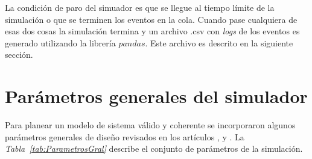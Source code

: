 La condición de paro del simuador es que se llegue al tiempo límite de la simulación o que se terminen los eventos en la cola. Cuando pase cualquiera de esas dos cosas la simulación termina y un archivo .csv con \textit{logs} de los eventos es generado utilizando la librería $pandas$. Este archivo es descrito en la siguiente sección. \newline



\section{Parámetros generales del simulador}\label{parametrossimulador}

Para planear un modelo de sistema válido y coherente se incorporaron algunos parámetros generales de diseño revisados en los artículos \parencite{Shahini2019}, \parencite{Mostafa2019} y \parencite{Gupta2018}. La \textit{Tabla~\ref{tab:ParametrosGral}} describe el conjunto de parámetros de la simulación.

